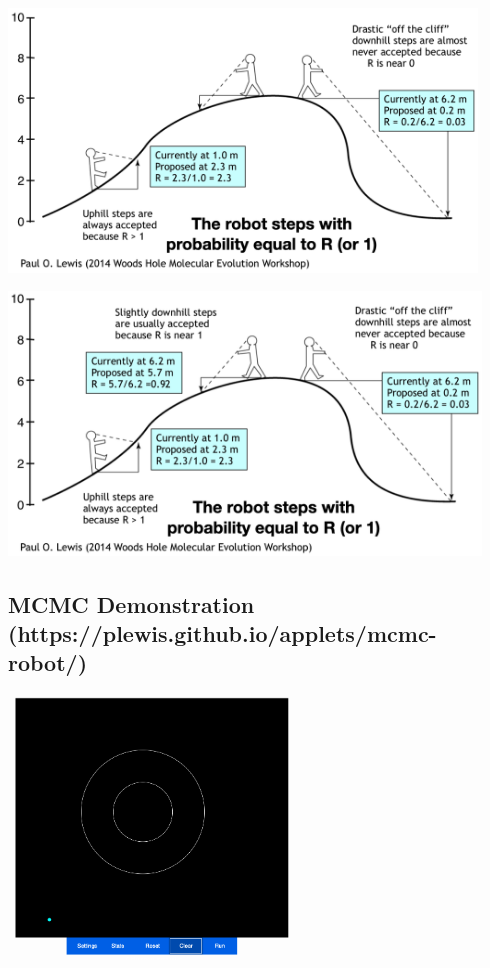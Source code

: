 \documentclass[
  letterpaper,
  DIV=11,
  numbers=noendperiod]{scrartcl}
\begin{document}
\begin{center}
  \includegraphics[height=7cm]{../graphics/mcmc-robot3.png}
\end{center}

\framebreak

\begin{center}
  \includegraphics[height=7cm]{../graphics/mcmc-robot4.png}
\end{center}

\hypertarget{mcmc-demonstration-httpsplewis.github.ioappletsmcmc-robot}{%
\subsection{MCMC Demonstration
(https://plewis.github.io/applets/mcmc-robot/)}\label{mcmc-demonstration-httpsplewis.github.ioappletsmcmc-robot}}

\begin{center}
  \includegraphics[height=7cm]{../graphics/mcmc-demo1.png}
\end{center}
\end{document}
